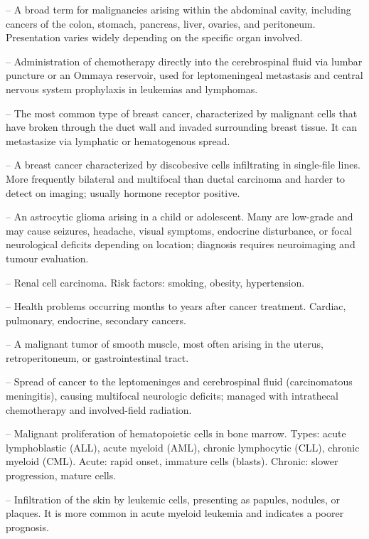 -- A broad term for malignancies arising within the abdominal cavity, including cancers of the colon, stomach, pancreas, liver, ovaries, and peritoneum. Presentation varies widely depending on the specific organ involved.

-- Administration of chemotherapy directly into the cerebrospinal fluid via lumbar puncture or an Ommaya reservoir, used for leptomeningeal metastasis and central nervous system prophylaxis in leukemias and lymphomas.

-- The most common type of breast cancer, characterized by malignant cells that have broken through the duct wall and invaded surrounding breast tissue. It can metastasize via lymphatic or hematogenous spread.

-- A breast cancer characterized by discobesive cells infiltrating in single-file lines. More frequently bilateral and multifocal than ductal carcinoma and harder to detect on imaging; usually hormone receptor positive.

-- An astrocytic glioma arising in a child or adolescent. Many are low-grade and may cause seizures, headache, visual symptoms, endocrine disturbance, or focal neurological deficits depending on location; diagnosis requires neuroimaging and tumour evaluation.

-- Renal cell carcinoma. Risk factors: smoking, obesity, hypertension.

-- Health problems occurring months to years after cancer treatment. Cardiac, pulmonary, endocrine, secondary cancers.

-- A malignant tumor of smooth muscle, most often arising in the uterus, retroperitoneum, or gastrointestinal tract.


-- Spread of cancer to the leptomeninges and cerebrospinal fluid (carcinomatous meningitis), causing multifocal neurologic deficits; managed with intrathecal chemotherapy and involved-field radiation.

-- Malignant proliferation of hematopoietic cells in bone marrow. Types: acute lymphoblastic (ALL), acute myeloid (AML), chronic lymphocytic (CLL), chronic myeloid (CML). Acute: rapid onset, immature cells (blasts). Chronic: slower progression, mature cells.

-- Infiltration of the skin by leukemic cells, presenting as papules, nodules, or plaques. It is more common in acute myeloid leukemia and indicates a poorer prognosis.

